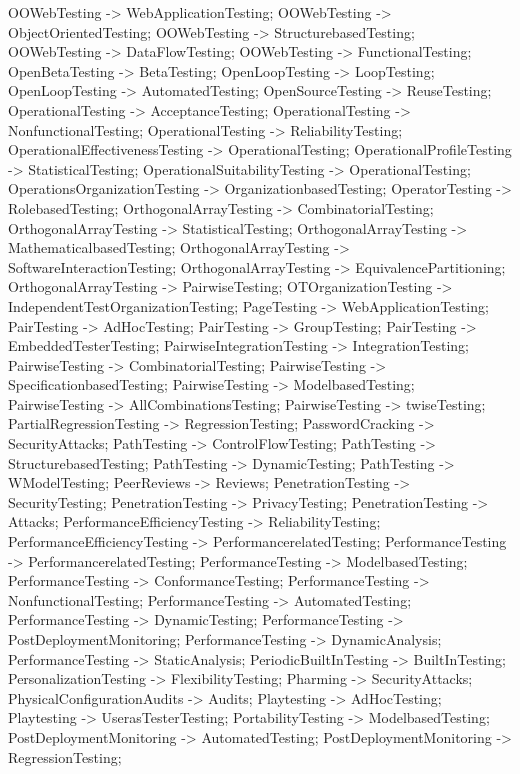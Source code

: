 \documentclass{article}
\begin{document}
{OOWebTesting -> WebApplicationTesting;
OOWebTesting -> ObjectOrientedTesting;
OOWebTesting -> StructurebasedTesting;
OOWebTesting -> DataFlowTesting;
OOWebTesting -> FunctionalTesting;
OpenBetaTesting -> BetaTesting;
OpenLoopTesting -> LoopTesting;
OpenLoopTesting -> AutomatedTesting;
OpenSourceTesting -> ReuseTesting;
OperationalTesting -> AcceptanceTesting;
OperationalTesting -> NonfunctionalTesting;
OperationalTesting -> ReliabilityTesting;
OperationalEffectivenessTesting -> OperationalTesting;
OperationalProfileTesting -> StatisticalTesting;
OperationalSuitabilityTesting -> OperationalTesting;
OperationsOrganizationTesting -> OrganizationbasedTesting;
OperatorTesting -> RolebasedTesting;
OrthogonalArrayTesting -> CombinatorialTesting;
OrthogonalArrayTesting -> StatisticalTesting;
OrthogonalArrayTesting -> MathematicalbasedTesting;
OrthogonalArrayTesting -> SoftwareInteractionTesting;
OrthogonalArrayTesting -> EquivalencePartitioning;
OrthogonalArrayTesting -> PairwiseTesting;
OTOrganizationTesting -> IndependentTestOrganizationTesting;
PageTesting -> WebApplicationTesting;
PairTesting -> AdHocTesting;
PairTesting -> GroupTesting;
PairTesting -> EmbeddedTesterTesting;
PairwiseIntegrationTesting -> IntegrationTesting;
PairwiseTesting -> CombinatorialTesting;
PairwiseTesting -> SpecificationbasedTesting;
PairwiseTesting -> ModelbasedTesting;
PairwiseTesting -> AllCombinationsTesting;
PairwiseTesting -> twiseTesting;
PartialRegressionTesting -> RegressionTesting;
PasswordCracking -> SecurityAttacks;
PathTesting -> ControlFlowTesting;
PathTesting -> StructurebasedTesting;
PathTesting -> DynamicTesting;
PathTesting -> WModelTesting;
PeerReviews -> Reviews;
PenetrationTesting -> SecurityTesting;
PenetrationTesting -> PrivacyTesting;
PenetrationTesting -> Attacks;
PerformanceEfficiencyTesting -> ReliabilityTesting;
PerformanceEfficiencyTesting -> PerformancerelatedTesting;
PerformanceTesting -> PerformancerelatedTesting;
PerformanceTesting -> ModelbasedTesting;
PerformanceTesting -> ConformanceTesting;
PerformanceTesting -> NonfunctionalTesting;
PerformanceTesting -> AutomatedTesting;
PerformanceTesting -> DynamicTesting;
PerformanceTesting -> PostDeploymentMonitoring;
PerformanceTesting -> DynamicAnalysis;
PerformanceTesting -> StaticAnalysis;
PeriodicBuiltInTesting -> BuiltInTesting;
PersonalizationTesting -> FlexibilityTesting;
Pharming -> SecurityAttacks;
PhysicalConfigurationAudits -> Audits;
Playtesting -> AdHocTesting;
Playtesting -> UserasTesterTesting;
PortabilityTesting -> ModelbasedTesting;
PostDeploymentMonitoring -> AutomatedTesting;
PostDeploymentMonitoring -> RegressionTesting;
}
\end{document}
